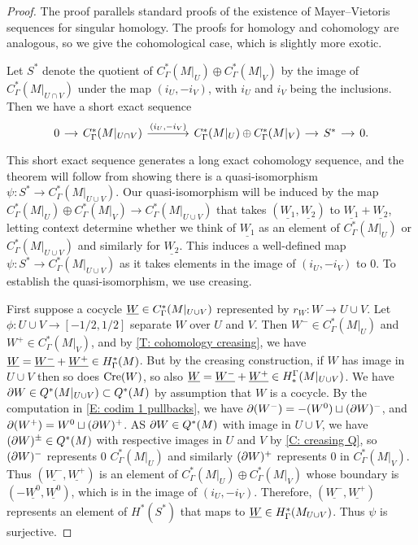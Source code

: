 \begin{proof}
	The proof parallels standard proofs of the existence of Mayer--Vietoris sequences for singular homology.
	The proofs for homology and cohomology are analogous, so we give the cohomological case, which is slightly more exotic.

	Let $S^*$ denote the quotient of $C_{\Gamma}^*(M|_U) \oplus C_{\Gamma}^{*}(M|_V)$ by the image of $C_{\Gamma}^*(M|_{U \cap V})$ under the map $(i_U, -i_V)$, with $i_U$ and $i_V$ being the inclusions.
	Then we have a short exact sequence
	\begin{equation}\label{E: homology MV SES}
		\begin{tikzcd}[
			column sep = small,
			arrow style = math font,
			cells = {nodes = {text height = 2ex,text depth = 0.75ex}}
			]
			0 \arrow[r] &
			C_{\Gamma}^{*}(M|_{U \cap V}) \arrow[r, "(i_U{,}-i_V)"] &[25pt]
			C_{\Gamma}^*(M|_U) \oplus C_{\Gamma}^{*}(M|_V) \arrow[r] &
			S^* \arrow[r] &
			0.
		\end{tikzcd}
	\end{equation}
	This short exact sequence generates a long exact cohomology sequence, and the theorem will follow from showing there is a quasi-isomorphism $\psi \colon S^* \to C_{\Gamma}^*(M|_{U \cup V})$.
	Our quasi-isomorphism will be induced by the map $C_{\Gamma}^*(M|_U) \oplus C_{\Gamma}^{*}(M|_V) \to C_{\Gamma}^*(M|_{U \cup V})$ that takes $(\underline{W_1},  \underline{W_2})$ to $\underline{W_1}+\underline{W_2}$, letting context determine whether we think of $\underline{W_1}$ as an element of $C_{\Gamma}^*(M|_U)$ or $C_{\Gamma}^*(M|_{U \cup V})$ and similarly for $\underline{W_2}$.
	This induces a well-defined map $\psi \colon S^* \to C_{\Gamma}^*(M|_{U \cup V})$ as it takes elements in the image of $(i_U,-i_V)$ to $0$.
	To establish the quasi-isomorphism, we use creasing.

	First suppose a cocycle $\underline{W} \in C_{\Gamma}^*(M|_{U \cup V})$ represented by $r_W \colon W \to U \cup V$.
	Let $\phi \colon U \cup V \to [-1/2,1/2]$ separate $W$ over $U$ and $V$.
	Then $W^- \in C_{\Gamma}^*(M|_{U})$ and $W^+ \in C_{\Gamma}^*(M|_{V})$, and by \cref{T: cohomology creasing}, we have $\underline{W} = \underline{W^-}+\underline{W^+} \in H^*_\Gamma(M)$.
	But by the creasing construction, if $W$ has image in $U \cup V$ then so does $\mathrm{Cre}(W)$, so also $\underline{W} = \underline{W^-}+\underline{W^+} \in H_*^\Gamma(M|_{U \cup V})$.
	We have $\partial W \in Q^*(M|_{U \cup V}) \subset Q^*(M)$ by assumption that $W$ is a cocycle.
	By the computation in \cref{E: codim 1 pullbacks}, we have $\partial( W^-) = -(W^0) \sqcup (\partial W)^-$, and $\partial (W^+) = W^0 \sqcup (\partial W)^+$.
	AS $\partial W \in Q^*(M)$ with image in $U \cup V$, we have $(\partial W)^\pm \in Q^*(M)$ with respective images in $U$ and $V$ by \cref{C: creasing Q}, so $(\partial W)^-$ represents $0$ $C^*_\Gamma(M|_U)$ and similarly $(\partial W)^+$ represents $0$ in $C^*_\Gamma(M|_V)$.
	Thus $(\underline{W^-}, \underline{W^+})$ is an element of $C_{\Gamma}^*(M|_U) \oplus C_{\Gamma}^{*}(M|_V)$ whose boundary is $(-\underline{W^0},\underline{W^0})$, which is in the image of $(i_U,-i_V)$.
	Therefore, $(\underline{W^-}, \underline{W^+})$ represents an element of
	$H^*(S^*)$ that maps to $\underline{W} \in H^*_\Gamma(M_{U \cup V})$.
	Thus $\psi$ is surjective.


\end{proof}
